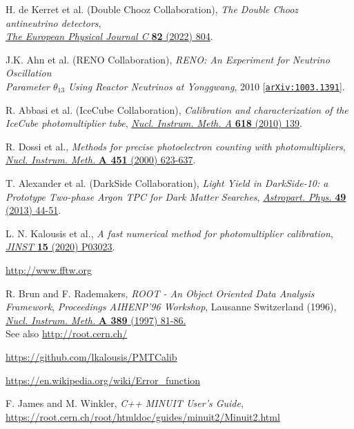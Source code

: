 \documentclass[a4paper,11pt]{article}
\begin{document}

\begin{thebibliography}{99}

H. de Kerret et al. (Double Chooz Collaboration), \emph{The Double Chooz antineutrino detectors},\\ 
\href{https://link.springer.com/article/10.1140/epjc/s10052-022-10726-x}{\emph{The European Physical Journal C} {\bf 82} (2022) 804}.

 J.K. Ahn et al. (RENO Collaboration), \emph{RENO: An Experiment for Neutrino Oscillation \\ Parameter $\theta_{13}$ Using Reactor Neutrinos at Yonggwang}, 2010
[\href{https://arxiv.org/abs/1003.1391}{\texttt{arXiv:1003.1391}}].

 R. Abbasi et al. (IceCube Collaboration), \emph{Calibration and characterization of the IceCube photomultiplier tube}, 
\href{https://www.sciencedirect.com/science/article/abs/pii/S0168900210006662}{ \emph{Nucl. Instrum. Meth. A} {\bf 618} (2010) 139}.

  R. Dossi {et al.}, \emph{Methods for precise photoelectron counting with photomultipliers}, 
\href{https://www.sciencedirect.com/science/article/pii/S0168900200003375}{\emph{Nucl. Instrum. Meth.} {\bf A 451} (2000) 623-637}.

 T. Alexander {et al.} (DarkSide Collaboration), \emph{Light Yield in DarkSide-10: a Prototype Two-phase Argon TPC for Dark Matter Searches}, 
\href{https://www.sciencedirect.com/science/article/pii/S0927650513001254?via\%3Dihub}{\emph{Astropart. Phys.} {\bf 49} (2013) 44-51}.  

 L. N. Kalousis {et al.}, \emph{A fast numerical method for photomultiplier calibration},\\  \href{https://iopscience.iop.org/article/10.1088/1748-0221/15/03/P03023}{\emph{JINST} {\bf 15} (2020) P03023}.

 \href{http://www.fftw.org}{http://www.fftw.org} 

 R. Brun and F. Rademakers, \emph{ROOT - An Object Oriented Data Analysis Framework}, \emph{Proceedings AIHENP'96 Workshop}, Lausanne Switzerland (1996),
\href{https://www.sciencedirect.com/science/article/pii/S016890029700048X?via\%3Dihub}{\emph{Nucl. Instrum. Meth.} {\bf A 389 } (1997) 81-86.} \\
See also \href{http://root.cern.ch/}{http://root.cern.ch/}

 \href{https://github.com/kalousis/PMTCalib}{https://github.com/lkalousis/PMTCalib}

 \href{https://en.wikipedia.org/wiki/Error\_function}{https://en.wikipedia.org/wiki/Error\_function}

 F. James and M. Winkler, \emph{C++ MINUIT User's Guide},
\href{https://root.cern.ch/root/htmldoc/guides/minuit2/Minuit2.html}{https://root.cern.ch/root/htmldoc/guides/minuit2/Minuit2.html}

\end{thebibliography}
\end{document}
